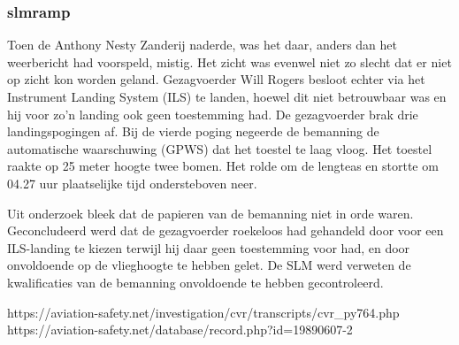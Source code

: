 \subsubsection{slmramp}
Toen de Anthony Nesty Zanderij naderde, was het daar, anders dan het weerbericht had voorspeld, mistig. Het zicht was evenwel niet zo slecht dat er niet op zicht kon worden geland. Gezagvoerder Will Rogers besloot echter via het Instrument Landing System (ILS) te landen, hoewel dit niet betrouwbaar was en hij voor zo'n landing ook geen toestemming had. De gezagvoerder brak drie landingspogingen af. Bij de vierde poging negeerde de bemanning de automatische waarschuwing (GPWS) dat het toestel te laag vloog. Het toestel raakte op 25 meter hoogte twee bomen. Het rolde om de lengteas en stortte om 04.27 uur plaatselijke tijd ondersteboven neer.

Uit onderzoek bleek dat de papieren van de bemanning niet in orde waren. 
Geconcludeerd werd dat de gezagvoerder roekeloos had gehandeld door voor een ILS-landing te kiezen terwijl hij daar geen toestemming voor had, en door onvoldoende op de vlieghoogte te hebben gelet. 
De SLM werd verweten de kwalificaties van de bemanning onvoldoende te hebben gecontroleerd.

https://aviation-safety.net/investigation/cvr/transcripts/cvr_py764.php 
https://aviation-safety.net/database/record.php?id=19890607-2 

